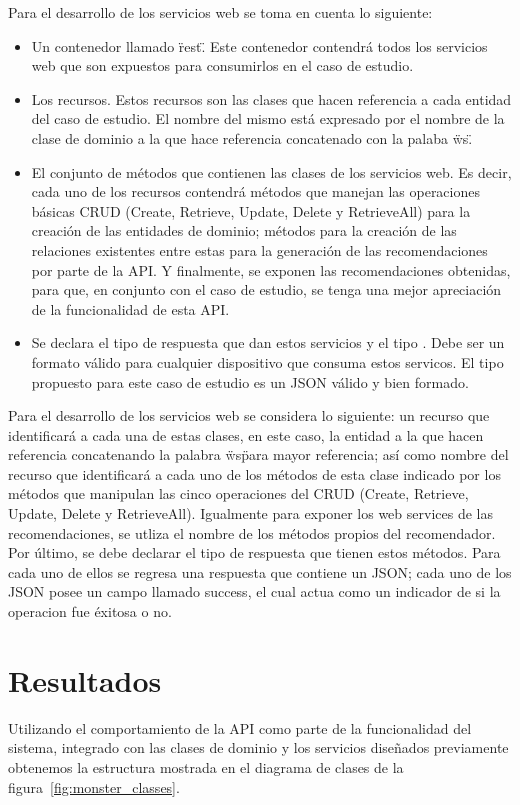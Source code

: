   Para el desarrollo de los servicios web se toma en cuenta lo siguiente:
  \begin{itemize}
    \item Un contenedor llamado \"rest\". Este contenedor contendrá todos los servicios web que son expuestos para consumirlos en el caso de estudio.
    \item Los recursos. Estos recursos son las clases que hacen referencia a cada entidad del caso de estudio. El nombre del mismo está expresado por el nombre de la clase de dominio a la que hace referencia concatenado con la palaba \"ws\".
    \item El conjunto de métodos que contienen las clases de los servicios web. Es decir, cada uno de los recursos contendrá métodos que manejan las operaciones básicas CRUD (Create, Retrieve, Update, Delete y RetrieveAll) para la creación de las entidades de dominio; métodos para la creación de las relaciones existentes entre estas para la generación de las recomendaciones por parte de la API. Y finalmente, se exponen las recomendaciones obtenidas, para que, en conjunto con el caso de estudio, se tenga una mejor apreciación de la funcionalidad de esta API.
    \item Se declara el tipo de respuesta que dan estos servicios y el tipo . Debe ser un formato válido para cualquier dispositivo que consuma estos servicos. El tipo propuesto para este caso de estudio es un JSON válido y bien formado.
  \end{itemize}

  Para el desarrollo de los servicios web se considera lo siguiente: un recurso que identificará a cada una de estas clases, en este caso, la entidad a la que hacen referencia concatenando la palabra \"ws\" para mayor referencia; así como nombre del recurso que identificará a cada uno de los métodos de esta clase indicado por los métodos que manipulan las cinco operaciones del CRUD (Create, Retrieve, Update, Delete y RetrieveAll). Igualmente para exponer los web services de las recomendaciones, se utliza el nombre de los métodos propios del recomendador. Por último, se debe declarar el tipo de respuesta que tienen estos métodos. Para cada uno de ellos se regresa una respuesta que contiene un JSON; cada uno de los JSON posee un campo llamado success, el cual actua como un indicador de si la operacion fue éxitosa o no.

  \section{Resultados}
    Utilizando el comportamiento de la API como parte de la funcionalidad del sistema, integrado con las clases de dominio y los servicios diseñados previamente obtenemos la estructura mostrada en el diagrama de clases de la figura~\ref{fig:monster_classes}. 

